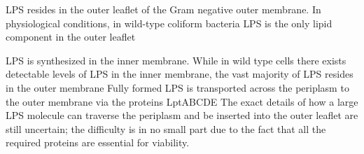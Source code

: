 \Ac{LPS} resides in the outer leaflet of the Gram negative outer membrane. In physiological conditions, in wild-type coliform bacteria \ac{LPS} is the only lipid component in the
outer leaflet

\Ac{LPS} is synthesized in the inner membrane. While in wild type cells there exists detectable levels of \ac{LPS} in the inner membrane, the vast majority of \ac{LPS} resides in
the outer membrane Fully formed \ac{LPS} is transported across the periplasm to the outer membrane via the proteins
LptABCDE The exact details of how a large \ac{LPS} molecule can traverse the periplasm and be inserted into the
outer leaflet are still uncertain; the difficulty is in no small part due to the fact that all the required proteins are essential for viability.


